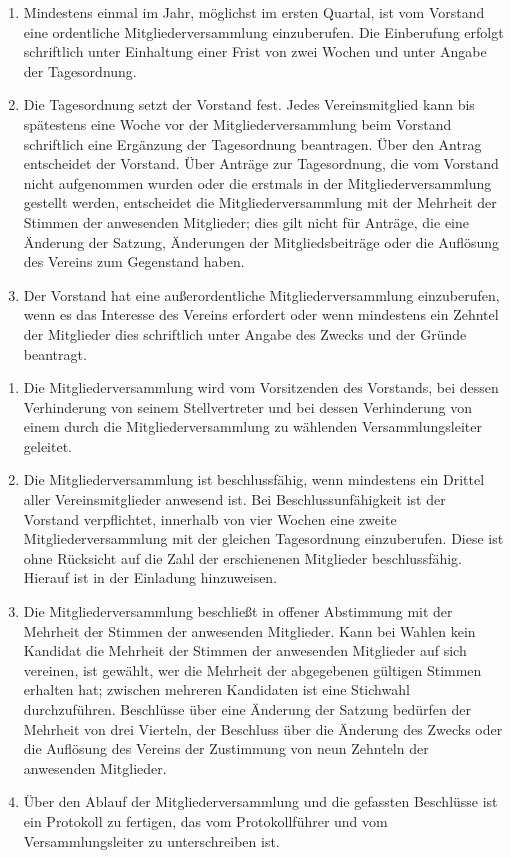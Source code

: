 \documentclass{scrartcl}
\begin{document}
\begin{contract}
\begin{enumerate}
    \item  Mindestens einmal im Jahr, möglichst im ersten Quartal, ist vom Vorstand eine ordentliche Mitgliederversammlung einzuberufen. Die Einberufung erfolgt schriftlich unter Einhaltung einer Frist von zwei Wochen und unter Angabe der Tagesordnung.
    \item Die Tagesordnung setzt der Vorstand fest. Jedes Vereinsmitglied kann bis spätestens eine Woche vor der Mitgliederversammlung beim Vorstand schriftlich eine Ergänzung der Tagesordnung beantragen. Über den Antrag entscheidet der Vorstand. Über Anträge zur  Tagesordnung, die vom Vorstand nicht aufgenommen wurden oder die erstmals in der     Mitgliederversammlung gestellt werden, entscheidet die Mitgliederversammlung mit der Mehrheit der Stimmen der anwesenden Mitglieder; dies gilt nicht für Anträge, die eine Änderung der Satzung, Änderungen der Mitgliedsbeiträge oder die Auflösung des Vereins zum Gegenstand haben.
    \item Der Vorstand hat eine außerordentliche Mitgliederversammlung einzuberufen, wenn es das Interesse des Vereins erfordert oder wenn mindestens ein Zehntel der Mitglieder dies schriftlich unter Angabe des Zwecks und der Gründe beantragt.
\end{enumerate}

\begin{enumerate}
    \item Die Mitgliederversammlung wird vom Vorsitzenden des Vorstands, bei dessen Verhinderung von seinem Stellvertreter und bei dessen Verhinderung von einem durch die Mitgliederversammlung zu wählenden Versammlungsleiter geleitet.
    \item Die Mitgliederversammlung ist beschlussfähig, wenn mindestens ein Drittel aller Vereinsmitglieder anwesend ist. Bei Beschlussunfähigkeit ist der Vorstand verpflichtet, innerhalb von vier Wochen eine zweite Mitgliederversammlung mit der gleichen Tagesordnung einzuberufen. Diese ist ohne Rücksicht auf die Zahl der erschienenen  Mitglieder beschlussfähig. Hierauf ist in der Einladung hinzuweisen.
    \item Die Mitgliederversammlung beschließt in offener Abstimmung mit der Mehrheit der Stimmen der anwesenden Mitglieder. Kann bei Wahlen kein Kandidat die Mehrheit der Stimmen der anwesenden Mitglieder auf sich vereinen, ist gewählt, wer die Mehrheit der abgegebenen gültigen Stimmen erhalten hat; zwischen mehreren Kandidaten ist eine Stichwahl durchzuführen. Beschlüsse über eine Änderung der Satzung bedürfen der Mehrheit von drei Vierteln, der Beschluss über die Änderung des Zwecks oder die Auflösung des Vereins der Zustimmung von neun Zehnteln der anwesenden Mitglieder.
    \item Über den Ablauf der Mitgliederversammlung und die gefassten Beschlüsse ist ein Protokoll zu fertigen, das vom Protokollführer und vom Versammlungsleiter zu unterschreiben ist.
\end{enumerate}

\end{contract}
\end{document}
